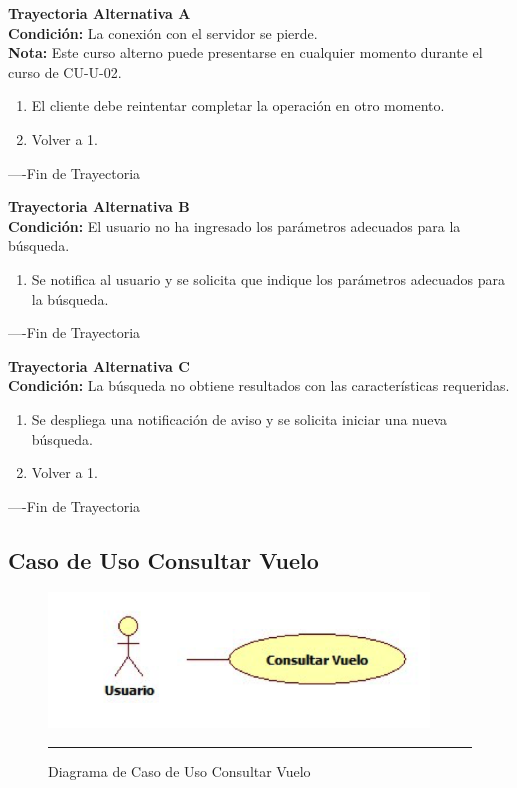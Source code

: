 \begin{flushleft}
	\hypertarget{TrayectoriaA_CU-U-02}{}
	\textbf{Trayectoria Alternativa A}\\
	\textbf{Condición:} La conexión con el servidor se pierde. \\
	\textbf{Nota: } Este curso alterno puede presentarse en cualquier momento durante el curso de CU-U-02. \\	
	\begin{enumerate}
		\item El cliente debe reintentar completar la operación en otro momento. 
		\item Volver a 1. 
	\end{enumerate}
\end{flushleft}
----Fin de Trayectoria

\begin{flushleft}
	\hypertarget{TrayectoriaB_CU-U-02}{}
	\textbf{Trayectoria Alternativa B}\\
	\textbf{Condición:} El usuario no ha ingresado los parámetros adecuados para la búsqueda. \\
	\begin{enumerate}
		\item  Se notifica al usuario y se solicita que indique los parámetros adecuados para la búsqueda.
	\end{enumerate}
\end{flushleft}
----Fin de Trayectoria

\begin{flushleft}
	\hypertarget{TrayectoriaC_CU-U-02}{}
	\textbf{Trayectoria Alternativa C}\\
	\textbf{Condición:} La búsqueda no obtiene resultados con las características requeridas. \\
	\begin{enumerate}
		\item Se despliega una notificación de aviso y se solicita iniciar una nueva búsqueda. 
		\item Volver a 1.
	\end{enumerate}
\end{flushleft}
----Fin de Trayectoria
\newpage
\subsection{Caso de Uso Consultar Vuelo}

\begin{figure}[htbp]
	\centering
		\includegraphics[width=0.9\textwidth]{Figuras/cuConsultarVuelo.png}
		\rule{30em}{0.5pt}
	\caption[Diagrama de Caso de Uso Consultar Vuelo]{Diagrama de Caso de Uso Consultar Vuelo}
	\label{fig:cuConsultarVuelo}
\end{figure}

